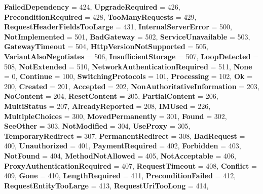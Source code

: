 \begin{DoxyCompactItemize}
{\bfseries Failed\+Dependency} = 424, 
{\bfseries Upgrade\+Required} = 426, 
{\bfseries Precondition\+Required} = 428, 
{\bfseries Too\+Many\+Requests} = 429, 
\newline
{\bfseries Request\+Header\+Fields\+Too\+Large} = 431, 
{\bfseries Internal\+Server\+Error} = 500, 
{\bfseries Not\+Implemented} = 501, 
{\bfseries Bad\+Gateway} = 502, 
\newline
{\bfseries Service\+Unavailable} = 503, 
{\bfseries Gateway\+Timeout} = 504, 
{\bfseries Http\+Version\+Not\+Supported} = 505, 
{\bfseries Variant\+Also\+Negotiates} = 506, 
\newline
{\bfseries Insufficient\+Storage} = 507, 
{\bfseries Loop\+Detected} = 508, 
{\bfseries Not\+Extended} = 510, 
{\bfseries Network\+Authentication\+Required} = 511, 
\newline
{\bfseries None} = 0, 
{\bfseries Continue} = 100, 
{\bfseries Switching\+Protocols} = 101, 
{\bfseries Processing} = 102, 
\newline
{\bfseries Ok} = 200, 
{\bfseries Created} = 201, 
{\bfseries Accepted} = 202, 
{\bfseries Non\+Authoritative\+Information} = 203, 
\newline
{\bfseries No\+Content} = 204, 
{\bfseries Reset\+Content} = 205, 
{\bfseries Partial\+Content} = 206, 
{\bfseries Multi\+Status} = 207, 
\newline
{\bfseries Already\+Reported} = 208, 
{\bfseries I\+M\+Used} = 226, 
{\bfseries Multiple\+Choices} = 300, 
{\bfseries Moved\+Permanently} = 301, 
\newline
{\bfseries Found} = 302, 
{\bfseries See\+Other} = 303, 
{\bfseries Not\+Modified} = 304, 
{\bfseries Use\+Proxy} = 305, 
\newline
{\bfseries Temporary\+Redirect} = 307, 
{\bfseries Permanent\+Redirect} = 308, 
{\bfseries Bad\+Request} = 400, 
{\bfseries Unauthorized} = 401, 
\newline
{\bfseries Payment\+Required} = 402, 
{\bfseries Forbidden} = 403, 
{\bfseries Not\+Found} = 404, 
{\bfseries Method\+Not\+Allowed} = 405, 
\newline
{\bfseries Not\+Acceptable} = 406, 
{\bfseries Proxy\+Authentication\+Required} = 407, 
{\bfseries Request\+Timeout} = 408, 
{\bfseries Conflict} = 409, 
\newline
{\bfseries Gone} = 410, 
{\bfseries Length\+Required} = 411, 
{\bfseries Precondition\+Failed} = 412, 
{\bfseries Request\+Entity\+Too\+Large} = 413, 
\newline
{\bfseries Request\+Uri\+Too\+Long} = 414, 

\end{DoxyCompactItemize}
